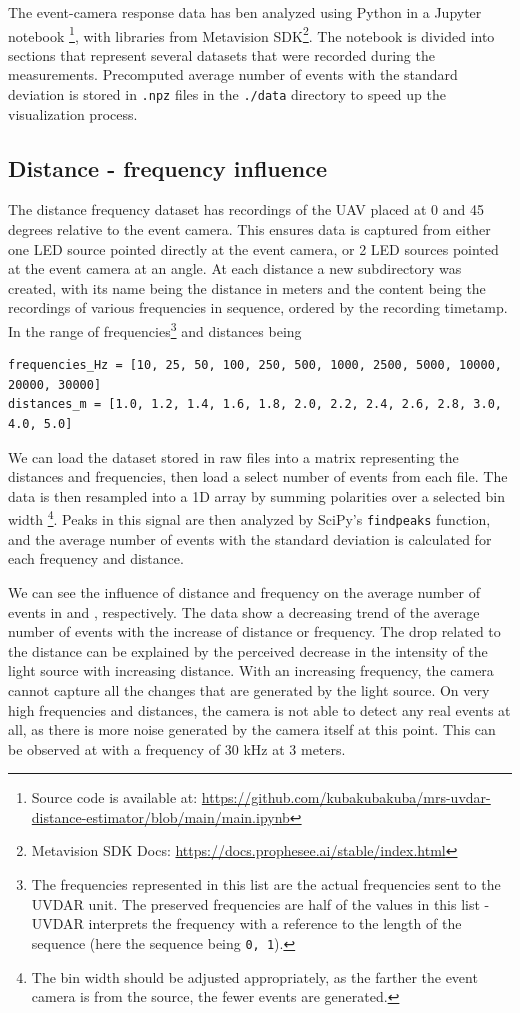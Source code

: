 The event-camera response data has ben analyzed using Python in a Jupyter notebook
\footnote{Source code is available at: \url{https://github.com/kubakubakuba/mrs-uvdar-distance-estimator/blob/main/main.ipynb}},
with libraries from Metavision SDK\footnote{Metavision SDK Docs: \url{https://docs.prophesee.ai/stable/index.html}}.
The notebook is divided into sections that represent several datasets that were recorded during the measurements.
Precomputed average number of events with the standard deviation is stored in \texttt{.npz} files in the \texttt{./data} directory to speed up the visualization process.

\subsection{Distance - frequency influence}

The distance frequency dataset has recordings of the UAV placed at 0 and 45 degrees relative to the event camera. This ensures data is captured from either
one LED source pointed directly at the event camera, or 2 LED sources pointed at the event camera at an angle. At each distance a new subdirectory was
created, with its name being the distance in meters and the content being the recordings of various frequencies in sequence, ordered by the recording timetamp.
In the range of frequencies\footnote{The frequencies represented in this list are the actual frequencies sent to the UVDAR unit. The preserved frequencies
are half of the values in this list - UVDAR interprets the frequency with a reference to the length of the sequence (here the sequence being \texttt{0, 1}).} and distances being
\begin{lstlisting}
frequencies_Hz = [10, 25, 50, 100, 250, 500, 1000, 2500, 5000, 10000, 20000, 30000]
distances_m = [1.0, 1.2, 1.4, 1.6, 1.8, 2.0, 2.2, 2.4, 2.6, 2.8, 3.0, 4.0, 5.0]
\end{lstlisting}
We can load the dataset stored in raw files into a matrix representing the distances and frequencies, then load a select number of events from each file.
The data is then resampled into a 1D array by summing polarities over a selected bin width
\footnote{The bin width should be adjusted appropriately, as the farther the event camera is from the source, the fewer events are generated.}.
Peaks in this signal are then analyzed by SciPy's \texttt{findpeaks} function,
and the average number of events with the standard deviation is calculated for each frequency and distance.

We can see the influence of distance and frequency on the average number of events in  and , respectively. The data show a decreasing trend of the average number of events
with the increase of distance or frequency. The drop related to the distance can be explained by the perceived decrease in the intensity of the light source with increasing distance. With an increasing frequency, the camera cannot capture
all the changes that are generated by the light source. On very high frequencies and distances, the camera is not able
to detect any real events at all, as there is more noise generated by the camera itself at this point. This can be observed
at  with a frequency of $30$ kHz at $3$ meters.

